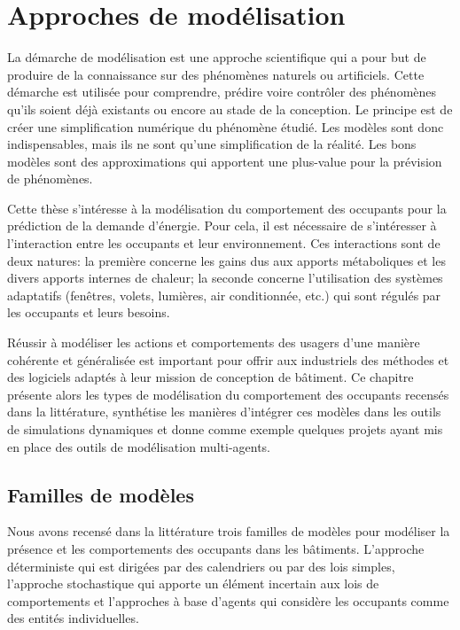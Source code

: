 \chapter{Approches de modélisation}
\label{Approches de modélisation}

La démarche de modélisation est une approche scientifique qui a pour but de produire de la connaissance sur des phénomènes naturels ou artificiels. Cette démarche est utilisée pour comprendre, prédire voire contrôler des phénomènes qu'ils soient déjà existants ou encore au stade de la conception. Le principe est de créer une simplification numérique du phénomène étudié. Les modèles sont donc indispensables, mais ils ne sont qu'une simplification de la réalité. Les bons modèles sont des approximations qui apportent une plus-value pour la prévision de phénomènes.

Cette thèse s'intéresse à la modélisation du comportement des occupants pour la prédiction de la demande d'énergie. Pour cela, il est nécessaire de s'intéresser à l'interaction entre les occupants et leur environnement. Ces interactions sont de deux natures: la première concerne les gains dus aux apports métaboliques et les divers apports internes de chaleur; la seconde concerne l'utilisation des systèmes adaptatifs (fenêtres, volets, lumières, air conditionnée, etc.) qui sont régulés par les occupants et leurs besoins.

Réussir à modéliser les actions et comportements des usagers d'une manière cohérente et généralisée est important pour offrir aux industriels des méthodes et des logiciels adaptés à leur mission de conception de bâtiment. Ce chapitre présente alors les types de modélisation du comportement des occupants recensés dans la littérature, synthétise les manières d'intégrer ces modèles dans les outils de simulations dynamiques et donne comme exemple quelques projets ayant mis en place des outils de modélisation multi-agents. 

\section{Familles de modèles}

Nous avons recensé dans la littérature trois familles de modèles pour modéliser la présence et  les comportements des occupants dans les bâtiments. L'approche déterministe qui est dirigées par des calendriers ou par des lois simples, l'approche stochastique qui apporte un élément incertain aux lois de comportements et l'approches à base d'agents qui considère les occupants comme des entités individuelles.

